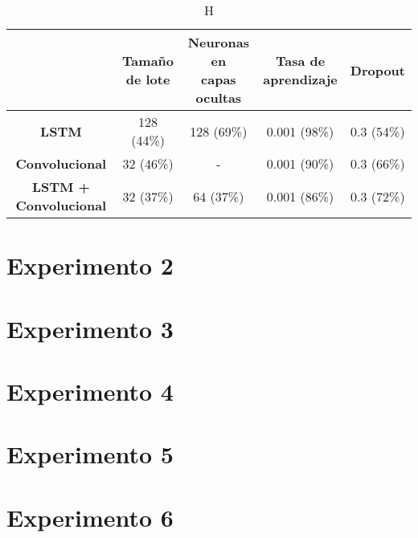 \documentclass[../main.tex]{subfiles}
\begin{document}
\begin{table}[H]
    \centering
    \renewcommand{\arraystretch}{1.2}
    \begin{tabular}{|c|c|c|c|c|}
        \hline
         & \makecell{Tamaño\\de lote}
           & \makecell{Neuronas en\\capas ocultas}
           & \makecell{Tasa de\\aprendizaje}
           & Dropout \\ \hline\hline
        \textbf{LSTM}                 & 128 (44\%) & 128 (69\%) & 0.001 (98\%) & 0.3 (54\%) \\ \hline
        \textbf{Convolucional}        & 32 (46\%)  &  -         & 0.001 (90\%) & 0.3 (66\%) \\ \hline
        \textbf{LSTM + Convolucional} & 32 (37\%)  & 64 (37\%)  & 0.001 (86\%) & 0.3 (72\%) \\
        \hline
    \end{tabular}
    \caption{H}
    \label{tab:hyperparams_exp1}
\end{table}


\section{Experimento 2}

\section{Experimento 3}

\section{Experimento 4}

\section{Experimento 5}

\section{Experimento 6}
\end{document}
